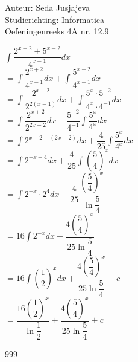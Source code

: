 \documentclass[a4paper]{article}
\newcommand{\integral}{\displaystyle\int}
\begin{document}
\noindent \large Auteur: Seda Jusjajeva\\
\noindent \large Studierichting: Informatica\\
\noindent \large Oefeningenreeks 4A nr. 12.9 \\

\medskip

\normalsize


$\integral\dfrac{2^{x + 2} + 5^{x - 2}}{4^{x - 1}}dx$ \\

$= \integral\dfrac{2^{x + 2}}{4^{x - 1}}dx + \integral\dfrac{ 5^{x - 2}}{4^{x - 1}}dx$ \\

$= \integral\dfrac{2^{x + 2}}{2^{2(x - 1)}}dx + \integral\dfrac{ 5^{x}\cdot 5^{-2}}{4^{x}\cdot 4^{-1}}dx$ \\

$= \integral\dfrac{2^{x + 2}}{2^{2x - 2}}dx + \dfrac{5^{-2}}{4^{-1}}\integral\dfrac{ 5^{x}}{4^{x}}dx$ \\

$= \integral 2^{x+2-(2x-2)} dx +  \dfrac{4}{25}\integral\dfrac{5^x}{4^x}dx$ \\

$= \integral 2^{-x+4} dx + \dfrac{4}{25}\integral\left(\dfrac{5}{4}\right)^xdx$ \\

$= \integral 2^{-x} \cdot 2^4 dx + \dfrac{4}{25}\dfrac{\left(\dfrac{5}{4}\right)^x}{\ln \dfrac{5}{4}}$ \\

$= 16 \integral 2^{-x} dx + \dfrac{4\left(\dfrac{5}{4}\right)^x}{25\ln \dfrac{5}{4}}$ \\

$= 16 \integral \left(\dfrac{1}{2}\right)^{x} dx + \dfrac{4\left(\dfrac{5}{4}\right)^x}{25\ln \dfrac{5}{4}} + c$ \\

$= \dfrac{16\left(\dfrac{1}{2}\right)^x}{\ln \dfrac{1}{2}} + \dfrac{4\left(\dfrac{5}{4}\right)^x}{25\ln \dfrac{5}{4}} + c$ \\

\begin{thebibliography}{999}
\end{thebibliography}
\end{document}
